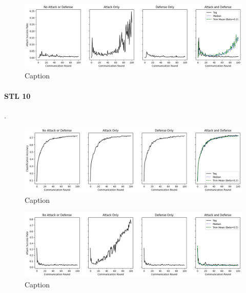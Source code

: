 \documentclass{article} %
\begin{document}
\begin{figure}[H]
    \centering
    \includegraphics[width=\textwidth]{cifar_100/neuro/tag/centralized/alpha10000--alpha_val10000/visuals/pois_accuracy--n_malicious1--beta0.2.png}
    \caption{Caption}
    \label{fig:my_label}
\end{figure}


%
\paragraph{STL 10}.

\begin{figure}[H]
    \centering
    \includegraphics[width=\textwidth]{stl_10/neuro/tag/centralized/alpha10000--alpha_val10000/visuals/clean_accuracy--n_malicious1--beta0.2.png}
    \caption{Caption}
    \label{fig:my_label}
\end{figure}

\begin{figure}[H]
    \centering
    \includegraphics[width=\textwidth]{stl_10/neuro/tag/centralized/alpha10000--alpha_val10000/visuals/pois_accuracy--n_malicious1--beta0.2.png}
    \caption{Caption}
    \label{fig:my_label}
\end{figure}
\end{document}
